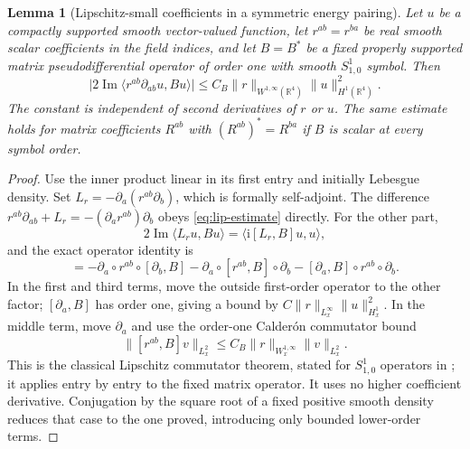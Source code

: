 \documentclass[11pt,a4paper]{article}
\numberwithin{equation}{section}
\newcommand{\R}{\mathbb R}
\newcommand{\ip}[2]{\langle #1,#2\rangle}
\newcommand{\ii}{\mathrm{i}}
\renewcommand{\Im}{\operatorname{Im}}
\newtheorem{lemma}[theorem]{Lemma}
\theoremstyle{definition}
\begin{document}
\begin{lemma}[Lipschitz-small coefficients in a symmetric energy pairing]\label{lem:commutator}
Let $u$ be a compactly supported smooth vector-valued function, let $r^{ab}=r^{ba}$ be real smooth scalar coefficients in the field indices, and let $B=B^*$ be a fixed properly supported matrix pseudodifferential operator of order one with smooth $S^1_{1,0}$ symbol. Then
\begin{equation}\label{eq:lip-estimate}
\bigl|2\Im\ip{r^{ab}\partial_{ab}u}{Bu}\bigr|
\leq C_B\|r\|_{W^{1,\infty}(\R^4)}\|u\|_{H^1(\R^4)}^2.
\end{equation}
The constant is independent of second derivatives of $r$ or $u$.
The same estimate holds for matrix coefficients $R^{ab}$ with
$(R^{ab})^*=R^{ba}$ if $B$ is scalar at every symbol order.
\end{lemma}

\begin{proof}
Use the inner product linear in its first entry and initially Lebesgue density. Set $L_r=-\partial_a(r^{ab}\partial_b)$, which is formally self-adjoint. The difference $r^{ab}\partial_{ab}+L_r=-(\partial_ar^{ab})\partial_b$ obeys \eqref{eq:lip-estimate} directly. For the other part,
\begin{equation*}
2\Im\ip{L_ru}{Bu}=\ip{\ii [L_r,B]u}{u},
\end{equation*}
and the exact operator identity is
\begin{equation*}
[L_r,B]=-\partial_a\circ r^{ab}\circ[\partial_b,B]
-\partial_a\circ[r^{ab},B]\circ\partial_b-[\partial_a,B]\circ r^{ab}\circ\partial_b.
\end{equation*}
In the first and third terms, move the outside first-order operator to the other factor; $[\partial_a,B]$ has order one, giving a bound by $C\|r\|_{L^{\infty}_x}\|u\|_{H^1_x}^2$. In the middle term, move $\partial_a$ and use the order-one Calder\'on commutator bound
\begin{equation*}
\|[r^{ab},B]v\|_{L^2_x}\leq C_B\|r\|_{W^{1,\infty}_x}\|v\|_{L^2_x}.
\end{equation*}
This is the classical Lipschitz commutator theorem, stated for $S^1_{1,0}$ operators in \cite[Theorem A]{BenyiOh}; it applies entry by entry to the fixed matrix operator. It uses no higher coefficient derivative. Conjugation by the square root of a fixed positive smooth density reduces that case to the one proved, introducing only bounded lower-order terms.
\end{proof}
\end{document}
